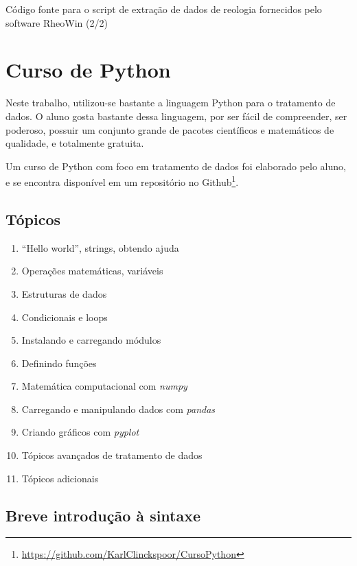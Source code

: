 \begin{apendicesenv}
\begin{listing}[H]
	\inputminted{python}{./python/extracao_reologia2.py}
	\caption{Código fonte para o script de extração de dados de reologia fornecidos pelo software RheoWin (2/2)} 
	\label{lst:extracao_reologia2}
\end{listing}

\chapter{Curso de Python}

Neste trabalho, utilizou-se bastante a linguagem Python para o tratamento de dados. O aluno gosta bastante dessa linguagem, por ser fácil de compreender, ser poderoso, possuir um conjunto grande de pacotes científicos e matemáticos de qualidade, e totalmente gratuita. 

Um curso de Python com foco em tratamento de dados foi elaborado pelo aluno, e se encontra disponível em um repositório no Github\footnote{\href{https://github.com/KarlClinckspoor/CursoPython}{https://github.com/KarlClinckspoor/CursoPython}}. 

\section{Tópicos}

	\begin{enumerate}[noitemsep]
		\item ``Hello world'', strings, obtendo ajuda
		\item Operações matemáticas, variáveis
		\item Estruturas de dados
		\item Condicionais e loops
		\item Instalando e carregando módulos
		\item Definindo funções
		\item Matemática computacional com \emph{numpy}
		\item Carregando e manipulando dados com \emph{pandas}
		\item Criando gráficos com \emph{pyplot}
		\item Tópicos avançados de tratamento de dados
		\item Tópicos adicionais
	\end{enumerate}

\section{Breve introdução à sintaxe}


\end{apendicesenv}
